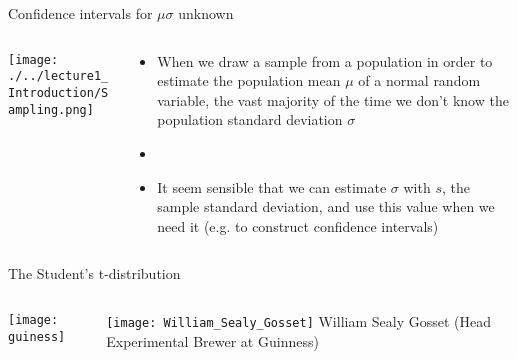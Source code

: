 \documentclass[xcolor=dvipsnames]{beamer}
\begin{document}
\begin{frame}{Confidence intervals for $\mu$}{$\sigma$ unknown}
\begin{columns}
	\begin{column}{.4 \textwidth}
		\begin{center}
			\texttt{[image: ./../lecture1\_Introduction/Sampling.png]}
		\end{center}
	\end{column}
	\begin{column}{.5 \textwidth}
		\begin{itemize}
			\item When we draw a sample from a population in order to estimate the population mean $\mu$ of a normal random variable, the vast majority of the time we don't know the population standard deviation $\sigma$  \pause
			\item[]
			\item It seem sensible that we can estimate $\sigma$ with $s$, the sample standard deviation, and use this value when we need it (e.g. to construct confidence intervals)
		\end{itemize}
	\end{column}
\end{columns}
\end{frame}

\begin{frame}{The Student's t-distribution}
	\begin{columns}
		\begin{column}{.5 \textwidth}
			\texttt{[image: guiness]}
		\end{column}
		\begin{column}{.5 \textwidth}
			\texttt{[image: William\_Sealy\_Gosset]}
			William Sealy Gosset (Head Experimental Brewer at Guinness)
		\end{column}
	\end{columns}
\end{frame}
\end{document}
